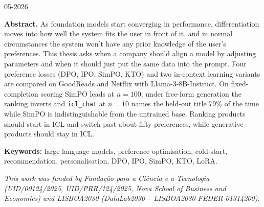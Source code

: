 \documentclass[12pt,a4paper]{article}
\begin{document}
\begin{titlepage}
\vspace{1.2cm}

\begin{center}
05-2026
\end{center}

\vfill

\noindent\textbf{Abstract.}
As foundation models start converging in performance, differentiation moves into
how well the system fits the user in front of it, and in normal circumstances the
system won't have any prior knowledge of the user's preferences. This thesis asks
when a company should align a model by adjusting parameters and when it should
just put the same data into the prompt. Four preference losses (DPO, IPO, SimPO,
KTO) and two in-context learning variants are compared on GoodReads and Netflix
with Llama-3-8B-Instruct. On fixed-completion scoring SimPO leads at $n = 100$;
under free-form generation the ranking inverts and \texttt{icl\_chat} at $n = 10$
names the held-out title 79\% of the time while SimPO is indistinguishable from
the untrained base. Ranking products should start in ICL and switch past about
fifty preferences, while generative products should stay in ICL.


\vspace{0.5em}

\noindent\textbf{Keywords:} large language models, preference optimisation, cold-start, recommendation, personalisation, DPO, IPO, SimPO, KTO, LoRA.

\vspace{1.5em}

\noindent\small\itshape
This work was funded by Funda\c{c}\~ao para a Ci\^encia e a Tecnologia (UID/00124/2025, UID/PRR/124/2025, Nova School of Business and Economics) and LISBOA2030 (DataLab2030 -- LISBOA2030-FEDER-01314200).

\end{titlepage}
\end{document}
